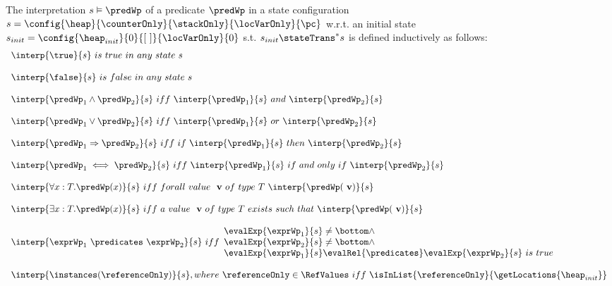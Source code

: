 \begin{interpPred} \label{interpPred} 
The interpretation $ s \vDash \predWp$ of a predicate $\predWp$ in a state configuration $s = \config{\heap}{\counterOnly}{ \stackOnly }{\locVarOnly}{\pc }$ 
w.r.t. an initial state  $ s_{init} = \config{\heap_{init}}{ 0 }{ \lbrack \ \rbrack  }{\locVarOnly}{ 0 } $ s.t. 
$s_{init} \stateTrans^{*} s $   is defined inductively as follows:
$$
\begin{array}{l}
\interp{\true}{s} \  is \ true \ in \ any \ state \ s \\
\\
\interp{\false}{s} \ is \ false \ in \ any \ state \ s \\
\\

\interp{\predWp_1  \wedge  \predWp_2 }{s} \ iff \ \interp{\predWp_1}{s} \ and \ \interp{\predWp_2}{s}  \\
\\

\interp{\predWp_1  \vee  \predWp_2 }{s} \ iff \ \interp{\predWp_1}{s} \ or \ \interp{\predWp_2}{s}  \\
\\
\interp{\predWp_1  \Rightarrow  \predWp_2 }{s} \ iff \ if \ \interp{\predWp_1}{s} \ then \ \interp{\predWp_2}{s}  \\
\\
\interp{\predWp_1  \iff \predWp_2 }{s} \ iff \  \interp{\predWp_1}{s} \ if \ and \ only \ if  \ \interp{\predWp_2}{s}  \\
\\
\interp{\forall x : T .  \predWp(x)   }{s} \ iff \ forall \ value \ \mbox{ \rm \textbf{v}} \ of \  type \  T \ \interp{\predWp(\mbox{ \rm \textbf{v}})}{s}  \\
\\

\interp{\exists x : T .  \predWp(x)   }{s} \ iff \ a \ value \ \mbox{ \rm \textbf{v}} \ of \  type \  T \ exists \ such \ that \ \interp{\predWp(\mbox{ \rm \textbf{v}})}{s}  \\
\\
\interp{\exprWp_1 \  \predicates \  \exprWp_2 }{s} \ iff \begin{array}{l}
                                                              \evalExp{\exprWp_1 }{s} \neq \bottom \wedge \\
							       \evalExp{\exprWp_2 }{s}\neq \bottom \wedge \\
                                                             \evalExp{\exprWp_1 }{s} \evalRel{\predicates }  \evalExp{\exprWp_2 }{s} \ is  \ true

							     \end{array} \\
\\

\interp{\instances(\referenceOnly) }{s}, where \ \referenceOnly \in \RefValues \ iff \    \isInList{\referenceOnly }{ \getLocations{\heap_{init}}}  
\end{array}
$$   
\end{interpPred}
